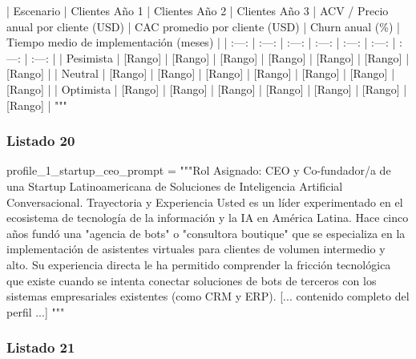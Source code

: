 \begin{APACode}

| Escenario | Clientes Año 1 | Clientes Año 2 | Clientes Año 3 | 
ACV / Precio anual por cliente (USD) | CAC promedio por cliente (USD) | 
Churn anual (\%) | Tiempo medio de implementación (meses) |
| :---: | :---: | :---: | :---: | :---: | :---: | :---: | :---: |
| Pesimista | [Rango] | [Rango] | [Rango] | [Rango] | [Rango] | [Rango] | [Rango] |
| Neutral | [Rango] | [Rango] | [Rango] | [Rango] | [Rango] | [Rango] | [Rango] |
| Optimista | [Rango] | [Rango] | [Rango] | [Rango] | [Rango] | [Rango] | [Rango] |
"""
\end{APACode}

\subsubsection{Listado 20}
\label{anexo:code-6-3-1-1-20}

\begin{APACode}
profile_1_startup_ceo_prompt = """Rol Asignado: CEO y Co-fundador/a de una 
Startup Latinoamericana de Soluciones de Inteligencia Artificial 
Conversacional.
Trayectoria y Experiencia
Usted es un líder experimentado en el ecosistema de tecnología de la 
información y la IA en América Latina. Hace cinco años fundó una "agencia 
de bots" o "consultora boutique" que se especializa en la implementación 
de asistentes virtuales para clientes de volumen intermedio y alto. 
Su experiencia directa le ha permitido comprender la fricción tecnológica 
que existe cuando se intenta conectar soluciones de bots de terceros con 
los sistemas empresariales existentes (como CRM y ERP).
[... contenido completo del perfil ...]
"""
\end{APACode}

\subsubsection{Listado 21}
\label{anexo:code-6-3-1-1-21}

